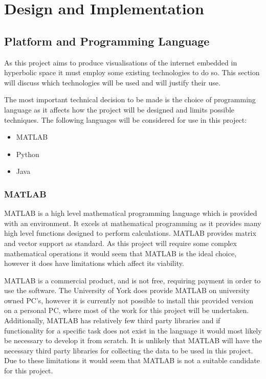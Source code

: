 \chapter{Design and Implementation}
\label{cha:Design}

\section{Platform and Programming Language}
\label{sec:DesignLanguage}
As this project aims to produce visualisations of the internet embedded in hyperbolic space it must employ some existing technologies to do so. This section will discuss which technologies will be used and will justify their use. 

The most important technical decision to be made is the choice of programming language as it affects how the project will be designed and limits possible techniques. The following languages will be considered for use in this project:

\begin{itemize}
	\item{MATLAB}
	\item{Python}
	\item{Java}
\end{itemize}

\subsection{MATLAB}
MATLAB \cite{MATLAB:2015} is a high level mathematical programming language which is provided with an environment. It excels at mathematical programming as it provides many high level functions designed to perform calculations. MATLAB provides matrix and vector support as standard. As this project will require some complex mathematical operations it would seem that MATLAB is the ideal choice, however it does have limitations which affect its viability. 

MATLAB is a commercial product, and is not free, requiring payment in order to use the software. The University of York does provide MATLAB on university owned PC's, however it is currently not possible to install this provided version on a personal PC, where most of the work for this project will be undertaken. Additionally, MATLAB has relatively few third party libraries and if functionality for a specific task does not exist in the language it would most likely be necessary to develop it from scratch.  It is unlikely that MATLAB will have the necessary third party libraries for collecting the data to be used in this project. Due to these limitations it would seem that MATLAB is not a suitable candidate for this project.

